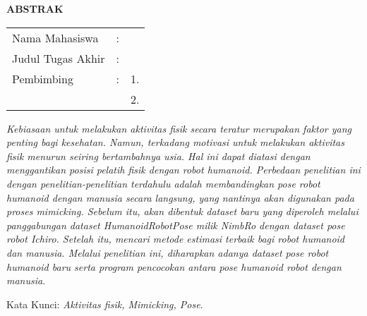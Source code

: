 \begin{center}
  \large\textbf{ABSTRAK}
\end{center}


\vspace{2ex}

\begingroup
\setlength{\tabcolsep}{0pt}

\noindent
\begin{tabularx}{\textwidth}{l >{\centering}m{2em} X}
  Nama Mahasiswa    & : & \name{}         \\

  Judul Tugas Akhir & : & \tatitle{}      \\

  Pembimbing        & : & 1. \advisor{}   \\
                    &   & 2. \coadvisor{} \\
\end{tabularx}
\endgroup

\emph{Kebiasaan untuk melakukan aktivitas fisik secara teratur merupakan faktor yang penting bagi kesehatan. 
Namun, terkadang motivasi untuk melakukan aktivitas fisik menurun seiring bertambahnya usia.
Hal ini dapat diatasi dengan menggantikan posisi pelatih fisik dengan robot humanoid. 
Perbedaan penelitian ini dengan penelitian-penelitian terdahulu adalah membandingkan pose robot humanoid dengan manusia secara langsung, 
yang nantinya akan digunakan pada proses mimicking. 
Sebelum itu, akan dibentuk dataset baru yang diperoleh melalui panggabungan  dataset HumanoidRobotPose milik NimbRo dengan dataset pose robot Ichiro. 
Setelah itu, mencari metode estimasi terbaik bagi robot humanoid dan manusia. 
Melalui penelitian ini, diharapkan adanya dataset pose robot humanoid baru serta program pencocokan antara pose humanoid robot dengan manusia}.

Kata Kunci: \emph{Aktivitas fisik, Mimicking, Pose}.

